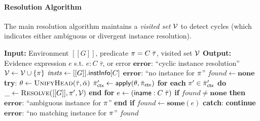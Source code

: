 \documentclass[a4paper, 11pt]{article}
\theoremstyle{remark}\newtheorem*{remark}{Remark}
\theoremstyle{definition}\newtheorem*{definition}{Definition}
\begin{document}
\paragraph{Resolution Algorithm}
The main resolution algorithm maintains a \emph{visited set} $\mathcal{V}$ to detect
cycles (which indicates either ambiguous or divergent instance resolution).
\begin{algorithm}[H]
\caption{Instance Resolution}
\begin{algorithmic}[1]
  \State \textbf{Input:} Environment $[[G]]$, predicate $\pi = C\;\bar{\tau}$, visited set $\mathcal{V}$
  \State \textbf{Output:} Evidence expression $e$ s.t. $e :  C\;\bar{\tau}$, or error
  \State
  \If{$\Pred \in \Visited$} \label{line:cycle}
  \State \Return $\mathbf{error}$:  ``cyclic instance resolution''
  \EndIf
  \State $\mathcal{V} \gets \mathcal{V} \cup \{\pi\}$
  \State
  \State $\mathit{insts} \gets [[G]].\mathsf{instInfo}[C]$ 
  \State \Return $\mathbf{error}$: ``no instance for $\pi$''
  \EndIf
  \State
  \State $\mathit{found} \gets \mathbf{none}$
   \label{line:search}
  \State \textbf{try}:
  \State \quad $\theta \gets \Call{UnifyHead}{\bar{\tau}, \bar{\alpha}}$ \label{line:unify}
  \State \quad $\bar{\pi}'_{\mathsf{ctx}} \gets \mathsf{apply}(\theta, \bar{\pi}_{\mathsf{ctx}})$ \label{line:apply-ctx}
  \State \quad \textbf{for each} $\pi' \in \bar{\pi}'_{\mathsf{ctx}}$ \textbf{do} \label{line:recurse}
  \State \quad\quad $\_ \gets \Call{Resolve}{[[G]], \pi', \Visited}$ 
  \State \quad \textbf{end for}
  \State \quad $e \gets (\mathsf{iname} :  C\;\bar{\tau})$  \label{line:evidence}
  \State \quad \textbf{if} $\mathit{found} \neq \mathbf{none}$ \textbf{then} \label{line:ambig}
  \State \quad\quad \Return $\mathbf{error}$:  ``ambiguous instance for $\pi$''
  \State \quad \textbf{end if}
  \State \quad $\mathit{found} \gets \mathbf{some}(e)$
  \State \textbf{catch}:  \textbf{continue} 
  \EndFor
  \State
  \State \Return $\mathbf{error}$:  ``no matching instance for $\pi$''
  \EndIf
  \State \Return $\mathit{found}$
  \EndFunction
\end{algorithmic}
\end{algorithm}
\end{document}

